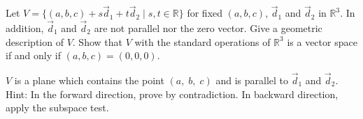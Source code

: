 

\begin{Exercise}[
name={},
title={}, 
difficulty=0,
origin={\cite{YL}}]
Let $V=\{(a,b,c)+s\vec{d}_1+t\vec{d}_2\;|\;s,t\in\mathbb{R}\}$ for fixed $(a,b,c)$, $\vec{d}_1$ and $\vec{d}_2$ in $\mathbb{R}^3$.  In addition, $\vec{d}_1$ and $\vec{d}_2$ are not parallel nor the zero vector.
\Question Give a geometric description of $V$.
\Question Show that $V$ with the standard operations of $\mathbb{R}^3$ is a vector space if and only if $(a,b,c)=(0,0,0)$.

\end{Exercise}

\begin{Answer}
\Question $V$ is a plane which contains the point $(a,\;b,\;c)$ and is parallel to $\vec{d}_1$ and $\vec{d}_2$.
\Question Hint: In the forward direction, prove by contradiction.  In backward direction, apply the subspace test. 
\end{Answer}
